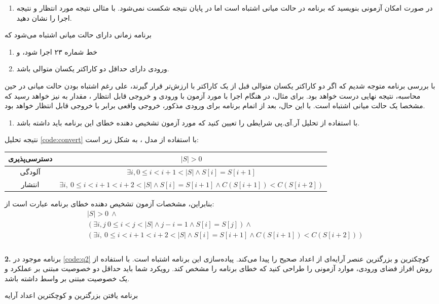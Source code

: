\documentclass{article}
\newenvironment{answer}{}{\\[.3ex]}
\newenvironment{question}[1]{\textbf{#1.} }{}
\newenvironment{qitem}[1]{%
	\begin{enumerate}\item[(#1)]}{\end{enumerate}}
\begin{document}
\begin{qitem}{d}
در صورت امکان آزمونی بنویسید که برنامه در حالت میانی اشتباه است اما در پایان نتیجه شکست نمی‌شود. با مثالی نتیجه مورد انتظار و نتیجه اجرا را نشان دهید.
\end{qitem}
\begin{answer}
برنامه زمانی دارای حالت میانی اشتباه می‌شود که
\begin{enumerate}
	\item خط شماره ۲۳ اجرا شود، و
	\item ورودی دارای حداقل دو کاراکتر یکسان متوالی باشد.
\end{enumerate}
با بررسی برنامه متوجه شدیم که اگر دو کاراکتر یکسان متوالی قبل از یک کاراکتر با ارزش‌تر قرار گیرند، علی رغم اشتباه بودن حالت میانی در حین محاسبه، نتیجه نهایی درست خواهد بود. برای مثال، در هنگام اجرا با مورد آزمون با ورودی  و خروجی قابل انتظار ، مقدار  به  نیز خواهد رسید که مشخصا یک حالت میانی اشتباه است. با این حال، بعد از اتمام برنامه برای ورودی مذکور، خروجی واقعی برابر با خروجی قابل انتظار خواهد بود.
\end{answer}
\begin{qitem}{e}
با استفاده از تحلیل آر.آی.پی شرایطی را تعیین کنید که مورد آزمون تشخیص دهنده خطای این برنامه باید داشته باشد.
\end{qitem}
\begin{answer}
نتیجه تحلیل \autoref{code:convert} با استفاده از مدل ، به شکل زیر است:

\begin{table}[h]
	\centering
\begin{tabular}{c|c}
	دسترسی‌پذیری & $|S| > 0$\\\hline
	آلودگی & $\exists i, 0 \leq i < i + 1 < |S| \wedge S[i]=S[i+1]$\\\hline
	انتشار &
	$\exists i,\ 0 \leq i < i + 1 < i + 2 < |S| \wedge S[i]=S[i+1] \wedge C(S[i+1]) < C(S[i+2])$
\end{tabular}
\end{table}
بنابراین، مشخصات آزمون تشخیص دهنده خطای برنامه عبارت است از:
\begin{align*}
	&|S| > 0\ \wedge\\
	&\left(\exists i, j\ 0 \leq i < j < |S| \wedge j - i = 1 \wedge S[i]=S[j]\right) \wedge\\
	& \left(\exists i,\ 0 \leq i < i + 1 < i + 2 < |S| \wedge S[i]=S[i+1] \wedge C(S[i+1]) < C(S[i+2])\right)\\
\end{align*}
\end{answer}
\begin{question}{2}
برنامه موجود در \autoref{code:q2} کوچکترین و بزرگترین عنصر آرایه‌ای از اعداد صحیح را پیدا می‌کند. پیاده‌سازی این برنامه اشتباه است. با استفاده از روش افراز فضای ورودی، موارد آزمونی را طراحی کنید که خطای برنامه را مشخص کند. رویکرد شما باید حداقل دو خصوصیت مبتنی بر عملکرد و یک خصوصیت مبتنی بر واسط داشته باشد.
\end{question}
\begin{listing}[h]
	\caption{برنامه یافتن بزرگترین و کوچکترین اعداد آرایه}
	\label{code:q2}
\end{listing}
\end{document}

